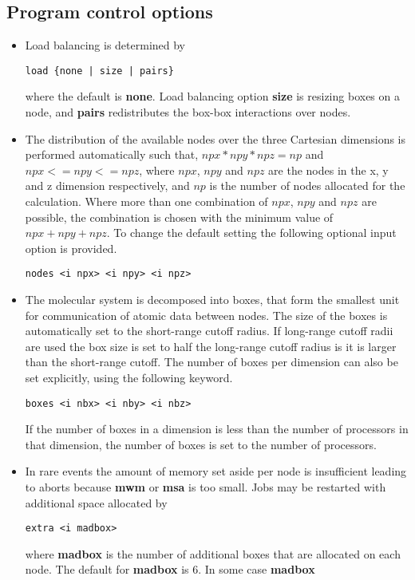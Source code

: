 \subsection{Program control options}
\begin{itemize}
\item
Load balancing is determined by
\begin{verbatim}
load {none | size | pairs}
\end{verbatim}
where the default is {\bf none}. Load balancing option {\bf size}
is resizing boxes on a node, and {\bf pairs} redistributes the
box-box interactions over nodes.
\item
The distribution of the available nodes over the three Cartesian
dimensions is performed automatically such that, $npx*npy*npz=np$
and $npx<=npy<=npz$, where $npx$, $npy$ and $npz$ are the nodes in the
x, y and z dimension respectively, and $np$ is the number of nodes
allocated for the calculation. Where more than one combination
of $npx$, $npy$ and $npz$ are possible, the combination is chosen with
the minimum value of $npx+npy+npz$. To change the default setting
the following optional input option is provided.
\begin{verbatim}
nodes <i npx> <i npy> <i npz>
\end{verbatim}
\item
The molecular system is decomposed into boxes, that form the smallest
unit for communication of atomic data between nodes. The size of the
boxes is automatically set to the short-range cutoff radius. If
long-range cutoff radii  are used the box size is set to half the
long-range cutoff radius is it is larger than the short-range cutoff.
The number of boxes per dimension can also be set explicitly, using
the following keyword.
\begin{verbatim}
boxes <i nbx> <i nby> <i nbz>
\end{verbatim}
If the number of boxes in a dimension is less than the number of
processors in that dimension, the number of boxes is set to the number
of processors.
\item
In rare events the amount of memory set aside per node is insufficient
leading to aborts because {\bf mwm} or {\bf msa} is too small. Jobs
may be restarted with additional space allocated by
\begin{verbatim}
extra <i madbox>
\end{verbatim}
where {\bf madbox} is the number of additional boxes that are allocated
on each node. The default for {\bf madbox} is 6. In some case {\bf madbox}

\end{itemize}
